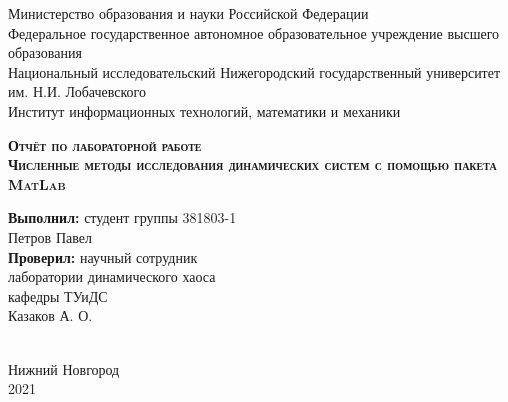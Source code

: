 \documentclass[12pt, a4paper]{article}
\begin{document}
\begin{titlepage}
\newpage

\begin{center}
Министерство образования и науки Российской Федерации \\
Федеральное государственное автономное образовательное
учреждение высшего образования \\
Национальный исследовательский Нижегородский государственный
университет им. Н.И. Лобачевского \\
Институт информационных технологий, математики и механики \\
\end{center}

\vspace{12em}

\begin{center}
\textsc{\textbf{Отчёт по лабораторной работе}}\\
\textsc{\textbf{Численные методы исследования динамических систем с помощью пакета MatLab}}
\end{center}

\vspace{14em}



\newbox{\lbox}
\newlength{\maxl}
\setlength{\maxl}{\wd\lbox}
\hfill\parbox{11cm}{
\hspace*{5cm}\hspace*{-2cm} \textbf{Выполнил:} студент группы 381803-1 \\
\hspace*{5cm}\hspace*{-2cm} Петров Павел \\
\hspace*{5cm}\hspace*{-2cm} \textbf{Проверил:} научный сотрудник \\
\hspace*{5cm}\hspace*{-2cm} лаборатории динамического хаоса \\
\hspace*{5cm}\hspace*{-2cm} кафедры ТУиДС \\
\hspace*{5cm}\hspace*{-2cm} Казаков А. О. \\
\\
}


\vspace{\fill}
\vspace{\fill}

\begin{center}
Нижний Новгород \\2021
\end{center}

\end{titlepage}
\end{document}
